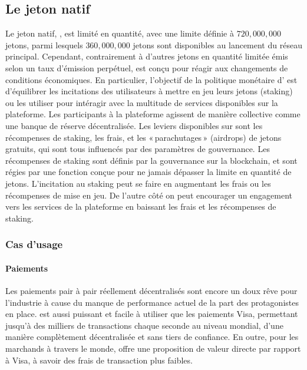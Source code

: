 \documentclass[runningheads,francais,a4paper]{llncs}
\begin{document}
\subsection{Le jeton natif \AVATokenName{}}
Le jeton natif, \AVATokenName{}, est limité en quantité, avec une limite définie à $720,000,000$ jetons, parmi lesquels
$360,000,000$ jetons sont disponibles au lancement du réseau principal. Cependant, contrairement à d'autres jetons en
quantité limitée émis selon un taux d'émission perpétuel, \AVATokenName{} est conçu pour réagir aux changements de
conditions économiques. En particulier, l'objectif de la politique monétaire d'\AVATokenName{} est d'équilibrer les
incitations des utilisateurs à mettre en jeu leurs jetons (staking) ou les utiliser pour intéragir avec la multitude de
services disponibles sur la plateforme. Les participants à la plateforme agissent de manière collective comme une banque
de réserve décentralisée. Les leviers disponibles sur \AVAPlatformName{} sont les récompenses de staking, les frais, et les
«\,parachutages\,» (airdrops) de jetons gratuits, qui sont tous influencés par des paramètres de gouvernance. Les
récompenses de staking sont définis par la gouvernance sur la blockchain, et sont régies par une fonction conçue pour
ne jamais dépasser la limite en quantité de jetons. L'incitation au staking peut se faire en augmentant les frais ou les
récompenses de mise en jeu. De l'autre côté on peut encourager un engagement vers les services de la plateforme
\AVAPlatformName{} en baissant les frais et les récompenses de staking.

\subsubsection{Cas d'usage}
\paragraph{Paiements}
Les paiements pair à pair réellement décentralisés sont encore un doux rêve pour l'industrie à cause du manque de
performance actuel de la part des protagonistes en place. \AVATokenName{} est aussi puissant et facile à utiliser que
les paiements Visa, permettant jusqu'à des milliers de transactions chaque seconde au niveau mondial, d'une manière
complètement décentralisée et sans tiers de confiance. En outre, pour les marchands à travers le monde, \AVATokenName{}
offre une proposition de valeur directe par rapport à Visa, à savoir des frais de transaction plus faibles.
\end{document}
